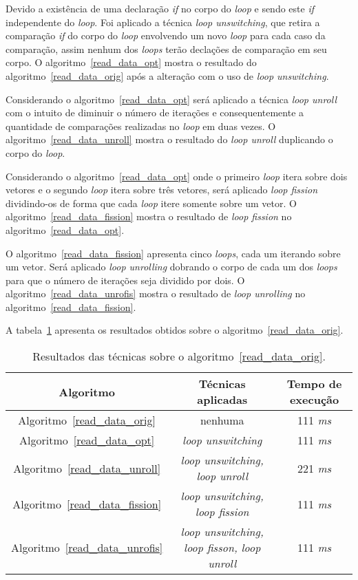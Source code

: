 Devido a existência de uma declaração \textit{if} no corpo do \textit{loop} e
sendo este \textit{if} independente do \textit{loop}. 
Foi aplicado a técnica \textit{loop unswitching}, que retira a comparação
\textit{if} do corpo do \textit{loop} envolvendo um novo \textit{loop} para cada caso
da comparação, assim nenhum dos \textit{loops} terão declações de comparação em seu
corpo.
O algoritmo~\ref{read_data_opt} mostra o resultado do
algoritmo~\ref{read_data_orig} após a alteração com o uso de \textit{loop unswitching}.

Considerando o algoritmo~\ref{read_data_opt} será aplicado a técnica 
\textit{loop unroll} com o intuito de diminuir o número de iterações e 
consequentemente a
quantidade de comparações realizadas no \textit{loop} em duas vezes. 
O algoritmo~\ref{read_data_unroll} mostra o resultado do \textit{loop
unroll} duplicando o corpo do \textit{loop}.

Considerando o algoritmo~\ref{read_data_opt} onde o primeiro \textit{loop} itera
sobre dois vetores e o segundo \textit{loop} itera
sobre três vetores, será aplicado \textit{loop fission} dividindo-os de forma
que cada \textit{loop} itere somente sobre um vetor.
O algoritmo~\ref{read_data_fission} mostra o resultado de \textit{loop fission}
no algoritmo~\ref{read_data_opt}.

O algoritmo~\ref{read_data_fission} apresenta cinco \textit{loops}, cada um
iterando sobre um vetor. Será aplicado \textit{loop unrolling} dobrando o corpo
de cada um dos \textit{loops} para que o número de iterações seja dividido por
dois.
O algoritmo~\ref{read_data_unrofis} mostra o resultado de \textit{loop
unrolling} no algoritmo~\ref{read_data_fission}.

A tabela~\ref{tabela_read_data} apresenta os resultados obtidos sobre o
algoritmo~\ref{read_data_orig}.

\begin{table}[H]
  \caption{Resultados das técnicas sobre o algoritmo~\ref{read_data_orig}.}
  \label{tabela_read_data}
\begin{center}
  \begin{tabular}{c|c|c}
    Algoritmo & Técnicas aplicadas & Tempo de execução\\
    \hline
    Algoritmo~\ref{read_data_orig} & nenhuma & 111 \textit{ms} \\
    \hline
    Algoritmo~\ref{read_data_opt} & \textit{loop unswitching} & 111 \textit{ms} \\
    \hline
    Algoritmo~\ref{read_data_unroll} & \textit{loop unswitching, loop unroll} & 221 \textit{ms} \\
    \hline
    Algoritmo~\ref{read_data_fission} & \textit{loop unswitching, loop fission} & 111 \textit{ms} \\
    \hline
  Algoritmo~\ref{read_data_unrofis} & \textit{loop unswitching, loop fisson, loop unroll} & 111 \textit{ms} \\
    \hline
  \end{tabular}
\end{center}
\end{table}


